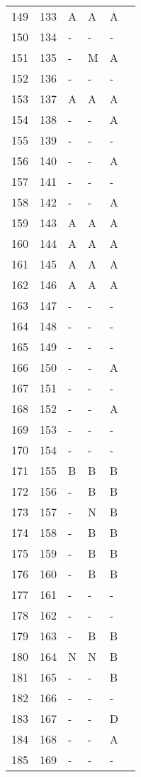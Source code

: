 \documentclass[10pt]{article}
\begin{document}
\begin{longtable}{llllll}
  149 & 133 & A & A & A &  \\ 
  150 & 134 & - & - & - &  \\ 
  151 & 135 & - & M & A &  \\ 
  152 & 136 & - & - & - &  \\ 
  153 & 137 & A & A & A &  \\ 
  154 & 138 & - & - & A &  \\ 
  155 & 139 & - & - & - &  \\ 
  156 & 140 & - & - & A &  \\ 
  157 & 141 & - & - & - &  \\ 
  158 & 142 & - & - & A &  \\ 
  159 & 143 & A & A & A &  \\ 
  160 & 144 & A & A & A &  \\ 
  161 & 145 & A & A & A &  \\ 
  162 & 146 & A & A & A &  \\ 
  163 & 147 & - & - & - &  \\ 
  164 & 148 & - & - & - &  \\ 
  165 & 149 & - & - & - &  \\ 
  166 & 150 & - & - & A &  \\ 
  167 & 151 & - & - & - &  \\ 
  168 & 152 & - & - & A &  \\ 
  169 & 153 & - & - & - &  \\ 
  170 & 154 & - & - & - &  \\ 
  171 & 155 & B & B & B &  \\ 
  172 & 156 & - & B & B &  \\ 
  173 & 157 & - & N & B &  \\ 
  174 & 158 & - & B & B &  \\ 
  175 & 159 & - & B & B &  \\ 
  176 & 160 & - & B & B &  \\ 
  177 & 161 & - & - & - &  \\ 
  178 & 162 & - & - & - &  \\ 
  179 & 163 & - & B & B &  \\ 
  180 & 164 & N & N & B &  \\ 
  181 & 165 & - & - & B &  \\ 
  182 & 166 & - & - & - &  \\ 
  183 & 167 & - & - & D &  \\ 
  184 & 168 & - & - & A &  \\ 
  185 & 169 & - & - & - &  \\ 

\end{longtable}
\end{document}
